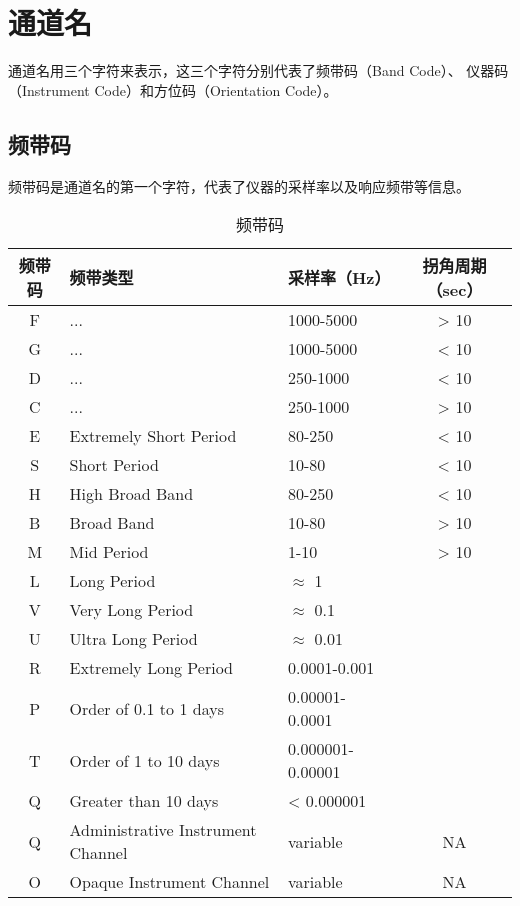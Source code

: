 \section{通道名}
通道名用三个字符来表示，这三个字符分别代表了频带码（Band Code）、
仪器码（Instrument Code）和方位码（Orientation Code）。

\subsection{频带码}
频带码是通道名的第一个字符，代表了仪器的采样率以及响应频带等信息。

\begin{table}[H]
\centering\small
\caption{频带码}
\label{tbl:bandcode}
\begin{tabular}{cllc}
\toprule
频带码      &   频带类型    &   采样率（\si{Hz}） & 拐角周期（sec） \\
\midrule
F           &   ...         &   1000-5000   &     > 10    \\
G           &   ...         &   1000-5000   &     < 10    \\
D           &   ...         &   250-1000    &     < 10    \\
C           &   ...         &   250-1000    &     > 10    \\
E           &   Extremely Short Period  & 80-250    &     < 10    \\
S           &   Short Period          & 10-80   & < 10    \\
H           &   High Broad Band         &   80-250    &   < 10    \\
B           &   Broad Band          &   10-80   & > 10    \\
M           &   Mid Period          &   1-10   & > 10    \\
L           &   Long Period         &   $\approx$ 1   &   \\
V           &   Very Long Period         & $\approx$ 0.1   &   \\
U           &   Ultra Long Period         & $\approx$ 0.01    &   \\
R           &   Extremely Long Period     & 0.0001-0.001    &   \\
P           &   Order of 0.1 to 1 days   & 0.00001-0.0001    &   \\
T           &   Order of 1 to 10 days    & 0.000001-0.00001    &   \\
Q           &   Greater than 10 days          &     < 0.000001    &   \\
Q           &   Administrative Instrument Channel   & variable    & NA    \\
O           &   Opaque Instrument Channel         & variable    &   NA    \\
\bottomrule
\end{tabular}
\end{table}


